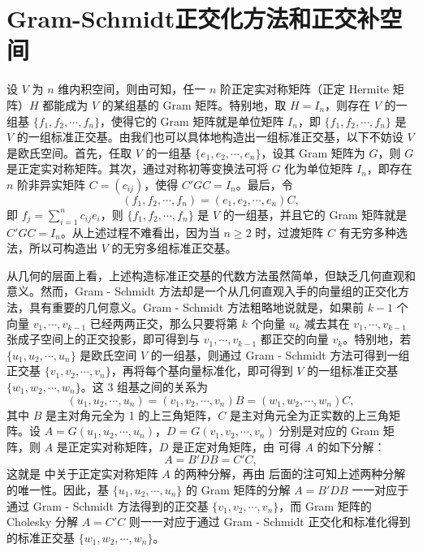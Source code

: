 \documentclass[../../main.tex]{subfiles}%
\begin{document}
\section{Gram-Schmidt正交化方法和正交补空间}

设 $V$ 为 $n$ 维内积空间，则由可知，任一 $n$ 阶正定实对称矩阵（正定 Hermite 矩阵）$H$ 都能成为 $V$ 的某组基的 Gram 矩阵。特别地，取 $H = I_n$，则存在 $V$ 的一组基 $\{f_1,f_2,\cdots,f_n\}$，使得它的 Gram 矩阵就是单位矩阵 $I_n$，即 $\{f_1,f_2,\cdots,f_n\}$ 是 $V$ 的一组标准正交基。由我们也可以具体地构造出一组标准正交基，以下不妨设 $V$ 是欧氏空间。首先，任取 $V$ 的一组基 $\{e_1,e_2,\cdots,e_n\}$，设其 Gram 矩阵为 $G$，则 $G$ 是正定实对称矩阵。其次，通过对称初等变换法可将 $G$ 化为单位矩阵 $I_n$，即存在 $n$ 阶非异实矩阵 $C = (c_{ij})$，使得 $C'GC = I_n$。最后，令
\[
(f_1,f_2,\cdots,f_n)=(e_1,e_2,\cdots,e_n)C,
\]
即 $f_j = \sum_{i = 1}^{n}c_{ij}e_i$，则 $\{f_1,f_2,\cdots,f_n\}$ 是 $V$ 的一组基，并且它的 Gram 矩阵就是 $C'GC = I_n$。从上述过程不难看出，因为当 $n\geqslant 2$ 时，过渡矩阵 $C$ 有无穷多种选法，所以可构造出 $V$ 的无穷多组标准正交基。

从几何的层面上看，上述构造标准正交基的代数方法虽然简单，但缺乏几何直观和意义。然而，Gram - Schmidt 方法却是一个从几何直观入手的向量组的正交化方法，具有重要的几何意义。Gram - Schmidt 方法粗略地说就是，如果前 $k - 1$ 个向量 $v_1,\cdots,v_{k - 1}$ 已经两两正交，那么只要将第 $k$ 个向量 $u_k$ 减去其在 $v_1,\cdots,v_{k - 1}$ 张成子空间上的正交投影，即可得到与 $v_1,\cdots,v_{k - 1}$ 都正交的向量 $v_k$。特别地，若 $\{u_1,u_2,\cdots,u_n\}$ 是欧氏空间 $V$ 的一组基，则通过 Gram - Schmidt 方法可得到一组正交基 $\{v_1,v_2,\cdots,v_n\}$，再将每个基向量标准化，即可得到 $V$ 的一组标准正交基 $\{w_1,w_2,\cdots,w_n\}$。这 3 组基之间的关系为
\[
(u_1,u_2,\cdots,u_n)=(v_1,v_2,\cdots,v_n)B=(w_1,w_2,\cdots,w_n)C,
\]
其中 $B$ 是主对角元全为 1 的上三角矩阵，$C$ 是主对角元全为正实数的上三角矩阵。设 $A = G(u_1,u_2,\cdots,u_n)$，$D = G(v_1,v_2,\cdots,v_n)$ 分别是对应的 Gram 矩阵，则 $A$ 是正定实对称矩阵，$D$ 是正定对角矩阵，由 可得 $A$ 的如下分解：
\[
A = B'DB = C'C,
\]
这就是 中关于正定实对称矩阵 $A$ 的两种分解，再由 后面的注可知上述两种分解的唯一性。因此，基 $\{u_1,u_2,\cdots,u_n\}$ 的 Gram 矩阵的分解 $A = B'DB$ 一一对应于通过 Gram - Schmidt 方法得到的正交基 $\{v_1,v_2,\cdots,v_n\}$，而 Gram 矩阵的 Cholesky 分解 $A = C'C$ 则一一对应于通过 Gram - Schmidt 正交化和标准化得到的标准正交基 $\{w_1,w_2,\cdots,w_n\}$。
\end{document}
